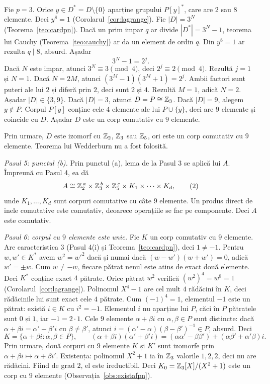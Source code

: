 \begin{solutie}
Fie $p=3$. Orice $y\in D^{*}=D\setminus\{0\}$ aparține grupului $P[y]^{*}$, care are $2$ sau $8$ elemente. Deci $y^{8}=1$ (Corolarul~\ref{cor:lagrange}). Fie $|D|=3^{N}$ (Teorema~\ref{teo:cardpn}). Dacă un prim impar $q$ ar divide $|D^{*}|=3^{N}-1$, teorema lui Cauchy (Teorema~\ref{teo:cauchy}) ar da un element de ordin $q$. Din $y^{8}=1$ ar rezulta $q\mid 8$, absurd. Așadar
\[
  3^{N}-1=2^{j}.
\]
Dacă $N$ este impar, atunci $3^{N}\equiv 3\pmod 4$, deci $2^{j}\equiv 2\pmod 4$. Rezultă $j=1$ și $N=1$. Dacă $N=2M$, atunci $(3^{M}-1)(3^{M}+1)=2^{j}$. Ambii factori sunt puteri ale lui $2$ și diferă prin $2$, deci sunt $2$ și $4$. Rezultă $M=1$, adică $N=2$. Așadar $|D|\in\{3,9\}$. Dacă $|D|=3$, atunci $D=P\cong\mathbb{Z}_3$. Dacă $|D|=9$, alegem $y\notin P$. Corpul $P[y]$ conține cele $4$ elemente ale lui $P\cup\{y\}$, deci are $9$ elemente și coincide cu $D$. Așadar $D$ este un corp comutativ cu $9$ elemente.

Prin urmare, $D$ este izomorf cu $\mathbb{Z}_2$, $\mathbb{Z}_3$ sau $\mathbb{Z}_5$, ori este un corp comutativ cu $9$ elemente. Teorema lui Wedderburn nu a fost folosită.

\smallskip
\textit{Pasul 5: punctul (b).} Prin punctul (a), lema de la Pasul 3 se aplică lui $A$. Împreună cu Pasul 4, ea dă
\[
  A\cong\mathbb{Z}_2^{\,a}\times\mathbb{Z}_3^{\,b}\times\mathbb{Z}_5^{\,c}\times K_1\times\dots\times K_d, \tag{2}
\]
unde $K_1,\dots,K_d$ sunt corpuri comutative cu câte $9$ elemente. Un produs direct de inele comutative este comutativ, deoarece operațiile se fac pe componente. Deci $A$ este comutativ.

\smallskip
\textit{Pasul 6: corpul cu $9$ elemente este unic.} Fie $K$ un corp comutativ cu $9$ elemente. Are caracteristica $3$ (Pasul 4(i) și Teorema~\ref{teo:cardpn}), deci $1\neq -1$. Pentru $w,w'\in K^{*}$ avem $w^{2}=w'^{2}$ dacă și numai dacă $(w-w')(w+w')=0$, adică $w'=\pm w$. Cum $w\neq -w$, fiecare pătrat nenul este atins de exact două elemente. Deci $K^{*}$ conține exact $4$ pătrate. Orice pătrat $w^{2}$ verifică $(w^{2})^{4}=w^{8}=1$ (Corolarul~\ref{cor:lagrange}). Polinomul $X^{4}-1$ are cel mult $4$ rădăcini în $K$, deci rădăcinile lui sunt exact cele $4$ pătrate. Cum $(-1)^{4}=1$, elementul $-1$ este un pătrat: există $i\in K$ cu $i^{2}=-1$. Elementul $i$ nu aparține lui $P$, căci în $P$ pătratele sunt $0$ și $1$, iar $-1=2\cdot 1$. Cele $9$ elemente $\alpha+\beta i$ cu $\alpha,\beta\in P$ sunt distincte: dacă $\alpha+\beta i=\alpha'+\beta' i$ cu $\beta\neq\beta'$, atunci $i=(\alpha'-\alpha)(\beta-\beta')^{-1}\in P$, absurd. Deci
\[
  K=\{\alpha+\beta i : \alpha,\beta\in P\},\qquad (\alpha+\beta i)(\alpha'+\beta' i)=(\alpha\alpha'-\beta\beta')+(\alpha\beta'+\alpha'\beta)i .
\]
Prin urmare, două corpuri cu $9$ elemente $K$ și $K'$ sunt izomorfe prin $\alpha+\beta i\mapsto\alpha+\beta i'$. Existența: polinomul $X^{2}+1$ ia în $\mathbb{Z}_3$ valorile $1,2,2$, deci nu are rădăcini. Fiind de grad $2$, el este ireductibil. Deci $K_0=\mathbb{Z}_3[X]/(X^{2}+1)$ este un corp cu $9$ elemente (Observația~\ref{obs:existafpn}).


\end{solutie}
